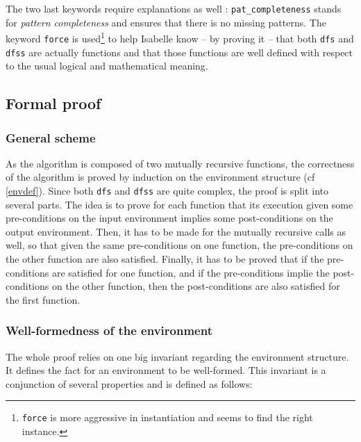 \documentclass[a4 paper, 12pt]{article}
\theoremstyle{definition}
\begin{document}
The two last keywords require explanations as well : \texttt{pat\_completeness} stands for \textit{pattern completeness} and ensures that there is no missing patterns. The keyword \texttt{force} is used\footnote{\texttt{force} is more aggressive in instantiation and seems to find the right instance.} to help Isabelle know -- by proving it -- that both \texttt{dfs} and \texttt{dfss} are actually functions and that those functions are well defined with respect to the usual logical and mathematical meaning.

\pagebreak

\subsection{Formal proof}
\subsubsection{General scheme}
As the algorithm is composed of two mutually recursive functions, the correctness of the algorithm is proved by induction on the environment structure (cf \ref{envdef}). Since both \texttt{dfs} and \texttt{dfss} are quite complex, the proof is split into several parts. The idea is to prove for each function that its execution given some pre-conditions on the input environment implies some post-conditions on the output environment. Then, it has to be made for the mutually recursive calls as well, so that given the same pre-conditions on one function, the pre-conditions on the other function are also satisfied. Finally, it has to be proved that if the pre-conditions are satisfied for one function, and if the pre-conditions implie the post-conditions on the other function, then the post-conditions are also satisfied for the first function.

\subsubsection{Well-formedness of the environment}
The whole proof relies on one big invariant regarding the environment structure. It defines the fact for an environment to be well-formed. This invariant is a conjunction of several properties and is defined as follows:
\end{document}
